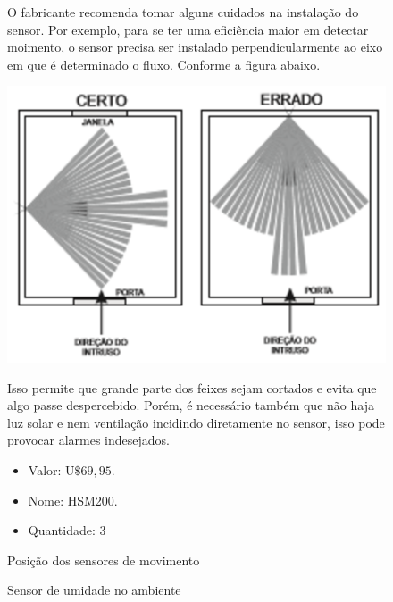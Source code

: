 \begin{enumerate}
\begin{figure}[h]
	O fabricante recomenda tomar alguns cuidados na instalação do sensor. Por exemplo, para se ter uma eficiência maior em detectar moimento, o sensor precisa ser instalado perpendicularmente ao eixo em que é determinado o fluxo. Conforme a figura abaixo.
	\end{figure}

	\begin{figure}[h]
	  \begin{center}
		\includegraphics[keepaspectratio]{figuras/sensores_posicao.eps}
		\caption{Posição dos sensores de movimento}
	  \end{center}
	
	Isso permite que grande parte dos feixes sejam cortados e evita que algo passe despercebido. Porém, é necessário também que não haja luz solar e nem ventilação incidindo diretamente no sensor, isso pode provocar alarmes indesejados.
	
	\begin{itemize}
		\item Valor: U$\$ 69,95$.
		\item Nome: HSM200. 
		\item Quantidade: 3
	\end{itemize}
	\end{figure}

	\begin{figure}[h]
	\item Sensor de umidade no ambiente 


\end{figure}
\end{enumerate}
